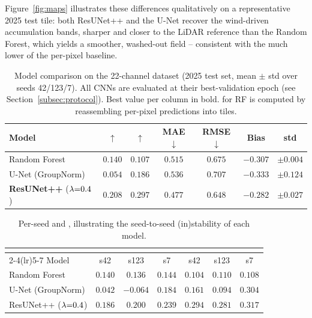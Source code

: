 Figure~\ref{fig:maps} illustrates these differences qualitatively on a
representative 2025 test tile: both ResUNet++ and the U-Net recover the
wind-driven accumulation bands, sharper and closer to the LiDAR reference than
the Random Forest, which yields a smoother, washed-out field -- consistent with
the much lower \SPAEF{} of the per-pixel baseline.

\begin{table}[t]
  \centering
  \caption{Model comparison on the 22-channel dataset (2025 test set, mean
  $\pm$ std over seeds 42/123/7). All CNNs are evaluated at their
  best-validation epoch (see Section~\ref{subsec:protocol}). Best value per
  column in bold. \SPAEF{} for RF is computed by reassembling per-pixel
  predictions into tiles.}
  \label{tab:comparison}
  \small
  \begin{tabular}{lcccccc}
    \toprule
    Model & \Rsq{}$\uparrow$ & \SPAEF{}$\uparrow$ & MAE$\downarrow$ &
    RMSE$\downarrow$ & Bias & \Rsq{} std \\
    \midrule
    Random Forest         & $0.140$ & $0.107$ & $0.515$ & $0.675$ & $-0.307$ & $\pm0.004$ \\
    U-Net (GroupNorm)     & $0.054$ & $0.186$ & $0.536$ & $0.707$ & $-0.333$ & $\pm0.124$ \\
    \textbf{ResUNet++} ($\lambda{=}0.4$) & $\mathbf{0.208}$ & $\mathbf{0.297}$ &
    $\mathbf{0.477}$ & $\mathbf{0.648}$ & $\mathbf{-0.282}$ & $\pm0.027$ \\
    \bottomrule
  \end{tabular}
\end{table}

\begin{table}[t]
  \centering
  \caption{Per-seed \Rsq{} and \SPAEF{}, illustrating the seed-to-seed
  (in)stability of each model.}
  \label{tab:perseed}
  \small
  \begin{tabular}{lcccccc}
    \toprule
    & \multicolumn{3}{c}{\Rsq{}} & \multicolumn{3}{c}{\SPAEF{}} \\
    \cmidrule(lr){2-4}\cmidrule(lr){5-7}
    Model & s42 & s123 & s7 & s42 & s123 & s7 \\
    \midrule
    Random Forest & $0.140$ & $0.136$ & $0.144$ & $0.104$ & $0.110$ & $0.108$ \\
    U-Net (GroupNorm) & $0.042$ & $-0.064$ & $0.184$ & $0.161$ & $0.094$ & $0.304$ \\
    ResUNet++ ($\lambda{=}0.4$) & $0.186$ & $0.200$ & $0.239$ & $0.294$ & $0.281$ & $0.317$ \\
    \bottomrule
  \end{tabular}
\end{table}

